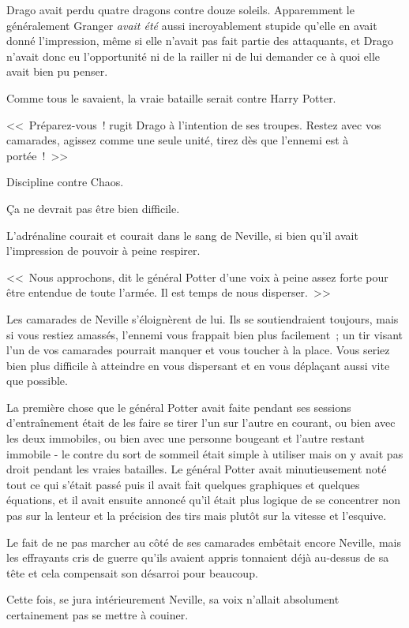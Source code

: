 Drago avait perdu quatre dragons contre douze soleils. Apparemment le généralement Granger \emph{avait été} aussi incroyablement stupide qu'elle en avait donné l'impression, même si elle n'avait pas fait partie des attaquants, et Drago n'avait donc eu l'opportunité ni de la railler ni de lui demander ce à quoi elle avait bien pu penser.

Comme tous le savaient, la vraie bataille serait contre Harry Potter.

<<~Préparez-vous~! rugit Drago à l'intention de ses troupes. Restez avec vos camarades, agissez comme une seule unité, tirez dès que l'ennemi est à portée~!~>>

Discipline contre Chaos.

Ça ne devrait pas être bien difficile.

\later

L'adrénaline courait et courait dans le sang de Neville, si bien qu'il avait l'impression de pouvoir à peine respirer.

<<~Nous approchons, dit le général Potter d'une voix à peine assez forte pour être entendue de toute l'armée. Il est temps de nous disperser.~>>

Les camarades de Neville s'éloignèrent de lui. Ils se soutiendraient toujours, mais si vous restiez amassés, l'ennemi vous frappait bien plus facilement~; un tir visant l'un de vos camarades pourrait manquer et vous toucher à la place. Vous seriez bien plus difficile à atteindre en vous dispersant et en vous déplaçant aussi vite que possible.

La première chose que le général Potter avait faite pendant ses sessions d'entraînement était de les faire se tirer l'un sur l'autre en courant, ou bien avec les deux immobiles, ou bien avec une personne bougeant et l'autre restant immobile - le contre du sort de sommeil était simple à utiliser mais on y avait pas droit pendant les vraies batailles. Le général Potter avait minutieusement noté tout ce qui s'était passé puis il avait fait quelques graphiques et quelques équations, et il avait ensuite annoncé qu'il était plus logique de se concentrer non pas sur la lenteur et la précision des tirs mais plutôt sur la vitesse et l'esquive.

Le fait de ne pas marcher au côté de ses camarades embêtait encore Neville, mais les effrayants cris de guerre qu'ils avaient appris tonnaient déjà au-dessus de sa tête et cela compensait son désarroi pour beaucoup.

Cette fois, se jura intérieurement Neville, sa voix n'allait absolument certainement pas se mettre à couiner.

